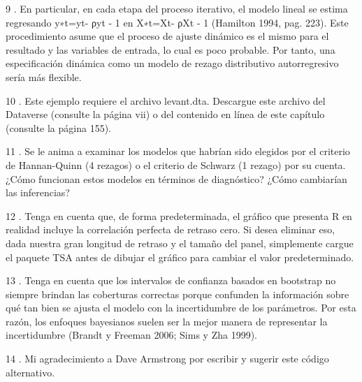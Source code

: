 \documentclass[
]{book}
\begin{document}
9 .
En particular, en cada etapa del proceso iterativo, el modelo lineal se estima regresando y∗t=yt- ρyt - 1 en X∗t=Xt- ρXt - 1 (Hamilton 1994, pag. 223). Este procedimiento asume que el proceso de ajuste dinámico es el mismo para el resultado y las variables de entrada, lo cual es poco probable. Por tanto, una especificación dinámica como un modelo de rezago distributivo autorregresivo sería más flexible.

10 .
Este ejemplo requiere el archivo levant.dta. Descargue este archivo del Dataverse (consulte la página vii) o del contenido en línea de este capítulo (consulte la página 155).

11 .
Se le anima a examinar los modelos que habrían sido elegidos por el criterio de Hannan-Quinn (4 rezagos) o el criterio de Schwarz (1 rezago) por su cuenta. ¿Cómo funcionan estos modelos en términos de diagnóstico? ¿Cómo cambiarían las inferencias?

12 .
Tenga en cuenta que, de forma predeterminada, el gráfico que presenta R en realidad incluye la correlación perfecta de retraso cero. Si desea eliminar eso, dada nuestra gran longitud de retraso y el tamaño del panel, simplemente cargue el paquete TSA antes de dibujar el gráfico para cambiar el valor predeterminado.

13 .
Tenga en cuenta que los intervalos de confianza basados \hspace{0pt}\hspace{0pt}en bootstrap no siempre brindan las coberturas correctas porque confunden la información sobre qué tan bien se ajusta el modelo con la incertidumbre de los parámetros. Por esta razón, los enfoques bayesianos suelen ser la mejor manera de representar la incertidumbre (Brandt y Freeman 2006; Sims y Zha 1999).

14 .
Mi agradecimiento a Dave Armstrong por escribir y sugerir este código alternativo.
\end{document}
